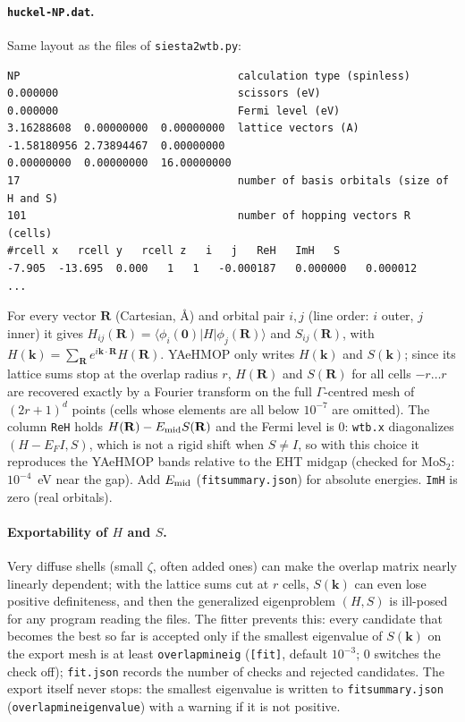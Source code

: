 \documentclass[11pt,a4paper]{article}
\newcommand{\cmd}[1]{\texttt{#1}}
\renewcommand{\_}{\origunderscore\allowbreak}
\begin{document}
\paragraph{\cmd{huckel-NP.dat}.} Same layout as the files of \cmd{siesta2wtb.py}:
\begin{lstlisting}
NP                                  calculation type (spinless)
0.000000                            scissors (eV)
0.000000                            Fermi level (eV)
3.16288608  0.00000000  0.00000000  lattice vectors (A)
-1.58180956 2.73894467  0.00000000
0.00000000  0.00000000  16.00000000
17                                  number of basis orbitals (size of H and S)
101                                 number of hopping vectors R (cells)
#rcell x   rcell y   rcell z   i   j   ReH   ImH   S
-7.905  -13.695  0.000   1   1   -0.000187   0.000000   0.000012
...
\end{lstlisting}
For every vector $\mathbf R$ (Cartesian, \AA) and orbital pair $i,j$ (line order: $i$ outer, $j$ inner) it gives
$H_{ij}(\mathbf R)=\langle\phi_i(\mathbf 0)|H|\phi_j(\mathbf R)\rangle$ and $S_{ij}(\mathbf R)$, with
$H(\mathbf k)=\sum_{\mathbf R}e^{i\mathbf k\cdot\mathbf R}H(\mathbf R)$. YAeHMOP only writes $H(\mathbf k)$ and
$S(\mathbf k)$; since its lattice sums stop at the overlap radius $r$, $H(\mathbf R)$ and $S(\mathbf R)$ for all cells
$-r\ldots r$ are recovered exactly by a Fourier transform on the full $\Gamma$-centred mesh of $(2r+1)^{d}$ points
(cells whose elements are all below $10^{-7}$ are omitted). The column \cmd{ReH} holds
$H(\mathbf R)-E_{\rm mid}S(\mathbf R)$ and the Fermi level is 0: \cmd{wtb.x} diagonalizes $(H-E_F I, S)$, which is
not a rigid shift when $S\neq I$, so with this choice it reproduces the YAeHMOP bands relative to the EHT midgap
(checked for MoS$_2$: $10^{-4}$~eV near the gap). Add $E_{\rm mid}$ (\cmd{fit\_summary.json}) for absolute energies.
\cmd{ImH} is zero (real orbitals).

\paragraph{Exportability of $H$ and $S$.} Very diffuse shells (small $\zeta$, often added ones) can make the overlap
matrix nearly linearly dependent; with the lattice sums cut at $r$ cells, $S(\mathbf k)$ can even lose positive
definiteness, and then the generalized eigenproblem $(H,S)$ is ill-posed for any program reading the files. The fitter
prevents this: every candidate that becomes the best so far is accepted only if the smallest eigenvalue of $S(\mathbf k)$
on the export mesh is at least \cmd{overlap\_min\_eig} (\cmd{[fit]}, default $10^{-3}$; 0 switches the check off);
\cmd{fit.json} records the number of checks and rejected candidates. The export itself never stops: the smallest
eigenvalue is written to \cmd{fit\_summary.json} (\cmd{overlap\_min\_eigenvalue}) with a warning if it is not positive.
\end{document}
